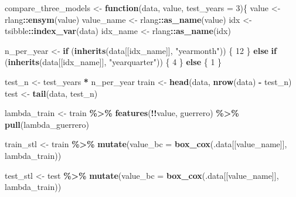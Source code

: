 \documentclass[
  11pt,
]{article}
\newenvironment{Shaded}{\begin{snugshade}}{\end{snugshade}}
\newcommand{\AttributeTok}[1]{\textcolor[rgb]{0.13,0.29,0.53}{#1}}
\newcommand{\ControlFlowTok}[1]{\textcolor[rgb]{0.13,0.29,0.53}{\textbf{#1}}}
\newcommand{\DecValTok}[1]{\textcolor[rgb]{0.00,0.00,0.81}{#1}}
\newcommand{\FunctionTok}[1]{\textcolor[rgb]{0.13,0.29,0.53}{\textbf{#1}}}
\newcommand{\NormalTok}[1]{#1}
\newcommand{\OtherTok}[1]{\textcolor[rgb]{0.56,0.35,0.01}{#1}}
\newcommand{\SpecialCharTok}[1]{\textcolor[rgb]{0.81,0.36,0.00}{\textbf{#1}}}
\newcommand{\StringTok}[1]{\textcolor[rgb]{0.31,0.60,0.02}{#1}}
\begin{document}
\begin{Shaded}
\begin{Highlighting}[]
\NormalTok{compare\_three\_models }\OtherTok{\textless{}{-}} \ControlFlowTok{function}\NormalTok{(data, value, }\AttributeTok{test\_years =} \DecValTok{3}\NormalTok{)\{}
\NormalTok{  value }\OtherTok{\textless{}{-}}\NormalTok{ rlang}\SpecialCharTok{::}\FunctionTok{ensym}\NormalTok{(value)}
\NormalTok{  value\_name }\OtherTok{\textless{}{-}}\NormalTok{ rlang}\SpecialCharTok{::}\FunctionTok{as\_name}\NormalTok{(value)}
\NormalTok{  idx }\OtherTok{\textless{}{-}}\NormalTok{ tsibble}\SpecialCharTok{::}\FunctionTok{index\_var}\NormalTok{(data)}
\NormalTok{  idx\_name }\OtherTok{\textless{}{-}}\NormalTok{ rlang}\SpecialCharTok{::}\FunctionTok{as\_name}\NormalTok{(idx)}

\NormalTok{  n\_per\_year }\OtherTok{\textless{}{-}} \ControlFlowTok{if}\NormalTok{ (}\FunctionTok{inherits}\NormalTok{(data[[idx\_name]], }\StringTok{"yearmonth"}\NormalTok{)) \{}
    \DecValTok{12}
\NormalTok{  \} }\ControlFlowTok{else} \ControlFlowTok{if}\NormalTok{ (}\FunctionTok{inherits}\NormalTok{(data[[idx\_name]], }\StringTok{"yearquarter"}\NormalTok{)) \{}
    \DecValTok{4}
\NormalTok{  \} }\ControlFlowTok{else}\NormalTok{ \{}
    \DecValTok{1}
\NormalTok{  \}}

\NormalTok{  test\_n }\OtherTok{\textless{}{-}}\NormalTok{ test\_years }\SpecialCharTok{*}\NormalTok{ n\_per\_year}
\NormalTok{  train }\OtherTok{\textless{}{-}} \FunctionTok{head}\NormalTok{(data, }\FunctionTok{nrow}\NormalTok{(data) }\SpecialCharTok{{-}}\NormalTok{ test\_n)}
\NormalTok{  test  }\OtherTok{\textless{}{-}} \FunctionTok{tail}\NormalTok{(data, test\_n)}

\NormalTok{  lambda\_train }\OtherTok{\textless{}{-}}\NormalTok{ train }\SpecialCharTok{\%\textgreater{}\%}
    \FunctionTok{features}\NormalTok{(}\SpecialCharTok{!!}\NormalTok{value, guerrero) }\SpecialCharTok{\%\textgreater{}\%}
    \FunctionTok{pull}\NormalTok{(lambda\_guerrero)}

\NormalTok{  train\_stl }\OtherTok{\textless{}{-}}\NormalTok{ train }\SpecialCharTok{\%\textgreater{}\%}
    \FunctionTok{mutate}\NormalTok{(}\AttributeTok{value\_bc =} \FunctionTok{box\_cox}\NormalTok{(.data[[value\_name]], lambda\_train))}

\NormalTok{  test\_stl }\OtherTok{\textless{}{-}}\NormalTok{ test }\SpecialCharTok{\%\textgreater{}\%}
    \FunctionTok{mutate}\NormalTok{(}\AttributeTok{value\_bc =} \FunctionTok{box\_cox}\NormalTok{(.data[[value\_name]], lambda\_train))}


\end{Highlighting}
\end{Shaded}
\end{document}
